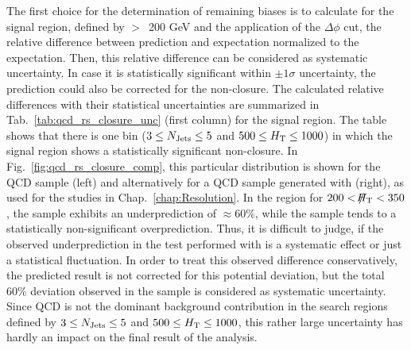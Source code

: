 The first choice for the determination of remaining biases is to calculate for the signal region, defined by \MHT $>$~200 GeV and the application of the $\Delta \phi$ cut, the relative difference between prediction and expectation normalized to the expectation. Then, this relative difference can be considered as systematic uncertainty. In case it is statistically significant within $\pm 1\sigma$ uncertainty, the prediction could also be corrected for the non-closure. The calculated relative differences with their statistical uncertainties are summarized in Tab.~\ref{tab:qcd_rs_closure_unc} (first column) for the signal region. The table shows that there is one bin ($3 \leq N_{\text{Jets}} \leq 5$ and $500 \leq H_{\text{T}} \leq 1000$\gev) in which the signal region shows a statistically significant non-closure. In Fig.~\ref{fig:qcd_rs_closure_comp}, this particular distribution is shown for the \madgraph QCD sample (left) and alternatively for a QCD sample generated with \pythia (right), as used for the studies in Chap.~\ref{chap:Resolution}. In the region for $200 < \slash\mkern-12mu{H}_{\text{T}} < 350$\gev, the \madgraph sample exhibits an underprediction of $\approx 60\%$, while the \pythia sample tends to a statistically non-significant overprediction. Thus, it is difficult to judge, if the observed underprediction in the test performed with \madgraph is a systematic effect or just a statistical fluctuation. In order to treat this observed difference conservatively, the predicted result is not corrected for this potential deviation, but the total 60\% deviation observed in the \madgraph sample is considered as systematic uncertainty. Since QCD is not the dominant background contribution in the search regions defined by $3 \leq N_{\text{Jets}} \leq 5$ and $500 \leq H_{\text{T}} \leq 1000$\gev, this rather large uncertainty has hardly an impact on the final result of the analysis.
